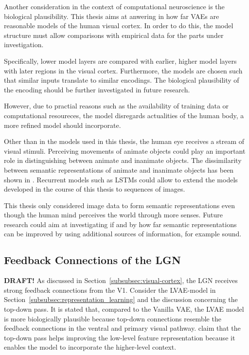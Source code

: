 Another consideration in the context of computational neuroscience is the biological plausibility.
This thesis aims at anwering in how far \acp{VAE} are reasonable models of the human visual cortex.
In order to do this, the model structure must allow comparisons with empirical data for the parts under investigation.

Specifically, lower model layers are compared with earlier, higher model layers with later regions in the visual cortex.
Furthermore, the models are chosen such that similar inputs translate to similar encodings.
The biological plausibility of the encoding should be further investigated in future research.

However, due to practial reasons such as the availability of training data or computational resoureces, the model disregards actualities of the human body, a more refined model should incorporate.

Other than in the models used in this thesis, the human eye receives a stream of visual stimuli.
Perceiving movements of animate objects could play an important role in distinguishing between animate and inanimate objects.
The dissimilarity between semantic representations of animate and inanimate objects has been shown in \citet{khaligh2014deep}.
Recurrent models such as LSTMs could allow to extend the models developed in the course of this thesis to sequences of images.

This thesis only considered image data to form semantic representations even though the human mind perceives the world through more senses.
Future research could aim at investigating if and by how far semantic representations can be improved by using additional sources of information, for example sound.

\subsection{Feedback Connections of the \acl{LGN}}\label{subsec:feedback-connections-of-the-lateral-geniculate-nucleus}
\textbf{DRAFT!}
As discussed in Section~\ref{subsubsec:visual-cortex}, the \ac{LGN} receives strong feedback connections from the \ac{V1}.
Consider the \ac{LVAE}-model in Section~\ref{subsubsec:representation_learning} and the discussion concerning the top-down pass.
It is stated that, compared to the Vanilla VAE, the \ac{LVAE} model is more biologically plausible because top-down connections resemble the feedback connections in the ventral and primary visual pathway.
\citet{sonderby2016ladder} claim that the top-down pass helps improving the low-level feature representation because it enables the model to incorporate the higher-level context.

